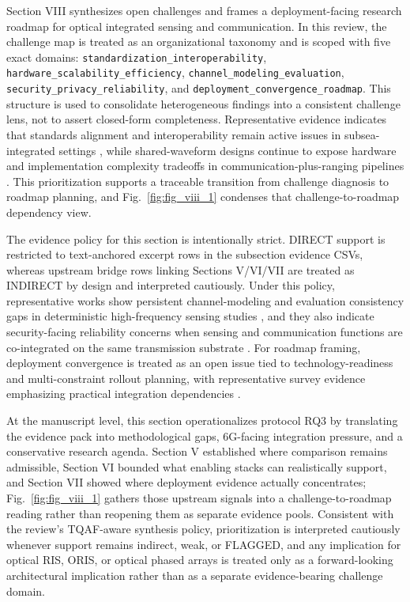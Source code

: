 \documentclass[lettersize,journal]{IEEEtran}
\begin{document}
Section VIII synthesizes open challenges and frames a deployment-facing research roadmap for optical integrated sensing and communication. In this review, the challenge map is treated as an organizational taxonomy and is scoped with five exact domains: \texttt{standardization\_interoperability}, \texttt{hardware\_scalability\_efficiency}, \texttt{channel\_modeling\_evaluation}, \texttt{security\_privacy\_reliability}, and \texttt{deployment\_convergence\_roadmap}. This structure is used to consolidate heterogeneous findings into a consistent challenge lens, not to assert closed-form completeness. Representative evidence indicates that standards alignment and interoperability remain active issues in subsea-integrated settings \cite{O_ISAC_220}, while shared-waveform designs continue to expose hardware and implementation complexity tradeoffs in communication-plus-ranging pipelines \cite{O_ISAC_035}. This prioritization supports a traceable transition from challenge diagnosis to roadmap planning, and Fig.~\ref{fig:fig_viii_1} condenses that challenge-to-roadmap dependency view.

The evidence policy for this section is intentionally strict. DIRECT support is restricted to text-anchored excerpt rows in the subsection evidence CSVs, whereas upstream bridge rows linking Sections V/VI/VII are treated as INDIRECT by design and interpreted cautiously. Under this policy, representative works show persistent channel-modeling and evaluation consistency gaps in deterministic high-frequency sensing studies \cite{O_ISAC_115}, and they also indicate security-facing reliability concerns when sensing and communication functions are co-integrated on the same transmission substrate \cite{O_ISAC_202}. For roadmap framing, deployment convergence is treated as an open issue tied to technology-readiness and multi-constraint rollout planning, with representative survey evidence emphasizing practical integration dependencies \cite{O_ISAC_163}.

At the manuscript level, this section operationalizes protocol RQ3 by translating the evidence pack into methodological gaps, 6G-facing integration pressure, and a conservative research agenda. Section V established where comparison remains admissible, Section VI bounded what enabling stacks can realistically support, and Section VII showed where deployment evidence actually concentrates; Fig.~\ref{fig:fig_viii_1} gathers those upstream signals into a challenge-to-roadmap reading rather than reopening them as separate evidence pools. Consistent with the review's TQAF-aware synthesis policy, prioritization is interpreted cautiously whenever support remains indirect, weak, or FLAGGED, and any implication for optical RIS, ORIS, or optical phased arrays is treated only as a forward-looking architectural implication rather than as a separate evidence-bearing challenge domain.
\end{document}
